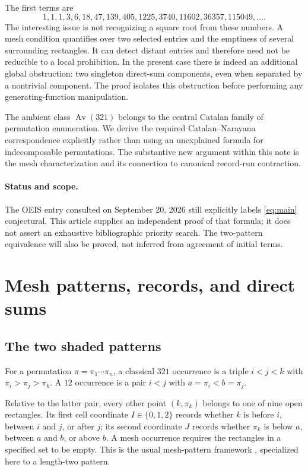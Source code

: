 \documentclass[11pt,a4paper]{article}
\theoremstyle{definition}
\theoremstyle{remark}
\newcommand{\Av}{\operatorname{Av}}
\begin{document}
The first terms are
\[
1,1,1,3,6,18,47,139,405,1225,3740,11602,36357,115049,\ldots.
\]
The interesting issue is not recognizing a square root from these numbers.
A mesh condition quantifies over two selected entries and the emptiness of
several surrounding rectangles. It can detect distant entries and therefore
need not be reducible to a local prohibition. In the present case there is
indeed an additional global obstruction: two singleton direct-sum components,
even when separated by a nontrivial component. The proof isolates this
obstruction before performing any generating-function manipulation.

The ambient class $\Av(321)$ belongs to the central Catalan family of
permutation enumeration. We derive the required Catalan--Narayana
correspondence explicitly rather than using an unexplained formula for
indecomposable permutations. The substantive new argument within this note
is the mesh characterization and its connection to canonical record-run
contraction.

\paragraph{Status and scope.}
The OEIS entry consulted on September 20, 2026 still explicitly labels
\eqref{eq:main} conjectural. This article supplies an independent proof of
that formula; it does not assert an exhaustive bibliographic priority search.
The two-pattern equivalence will also be proved, not inferred from agreement
of initial terms.

\section{Mesh patterns, records, and direct sums}

\subsection{The two shaded patterns}

For a permutation $\pi=\pi_1\cdots\pi_n$, a classical $321$ occurrence is a
triple $i<j<k$ with $\pi_i>\pi_j>\pi_k$. A $12$ occurrence is a pair
$i<j$ with $a=\pi_i<b=\pi_j$.

Relative to the latter pair, every other point $(k,\pi_k)$ belongs to one
of nine open rectangles. Its first cell coordinate $I\in\{0,1,2\}$ records
whether $k$ is before $i$, between $i$ and $j$, or after $j$; its second
coordinate $J$ records whether $\pi_k$ is below $a$, between $a$ and $b$,
or above $b$. A mesh occurrence requires the rectangles in a specified set
to be empty. This is the usual mesh-pattern framework
\cite{branden-claesson}, specialized here to a length-two pattern.
\end{document}
